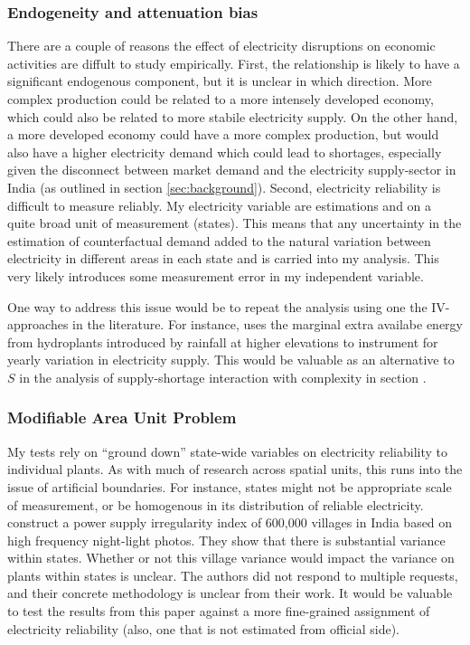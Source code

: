 \documentclass[11pt]{article}
\begin{document}
\subsubsection{Endogeneity and attenuation bias}
\label{sec:orgd4457e7}
There are a couple of reasons the effect of electricity disruptions on economic activities are diffult to study empirically. First, the relationship is likely to have a significant endogenous component, but it is unclear in which direction. More complex production could be related to a more intensely developed economy, which could also be related to more stabile electricity supply. On the other hand, a more developed economy could have a more complex production, but would also have a higher electricity demand which could lead to shortages, especially given the disconnect between market demand and the electricity supply-sector in India (as outlined in section \ref{sec:background}). Second, electricity reliability is difficult to measure reliably. My electricity variable are estimations and on a quite broad unit of measurement (states). This means that any uncertainty in the estimation of counterfactual demand added to the natural variation between electricity in different areas in each state and is carried into my analysis. This very likely introduces some measurement error in my independent variable.

One way to address this issue would be to repeat the analysis using one the IV-approaches in the literature. For instance, \cite{allcott_how_2016} uses the marginal extra availabe energy from hydroplants introduced by rainfall at higher elevations to instrument for yearly variation in electricity supply. This would be valuable as an alternative to $S$ in the analysis of supply-shortage interaction with complexity in section \label{sub:regressions}.

\subsubsection{Modifiable Area Unit Problem}
\label{sec:org4e3cc26}
My tests rely on ``ground down'' state-wide variables on electricity reliability to individual plants. As with much of research across spatial units, this runs into the issue of artificial boundaries. For instance, states might not be appropriate scale of measurement, or be homogenous in its distribution of reliable electricity. \cite{min_whose_2017-2} construct a power supply irregularity index of 600,000 villages in India based on high frequency night-light photos. They show that there is substantial variance within states. Whether or not this village variance would impact the variance on plants within states is unclear. The authors did not respond to multiple requests, and their concrete methodology is unclear from their work. It would be valuable to test the results from this paper against a more fine-grained assignment of electricity reliability (also, one that is not estimated from official side).
\end{document}
